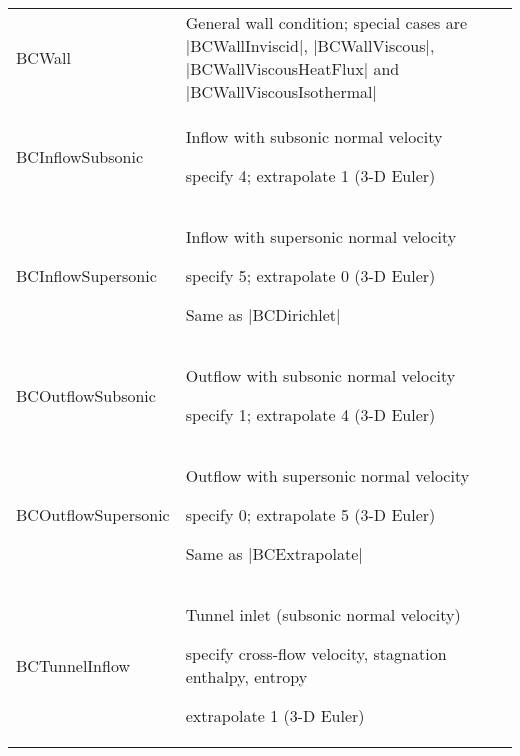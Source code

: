 \begin{longtable}{>{\ttfamily}p{\tmplengtha} >{\raggedright\arraybackslash}p{\Pwidth}}
BCWall                  & General wall condition; special cases are
                          |BCWallInviscid|, |BCWallViscous|,
                          |BCWallViscousHeatFlux| and
                          |BCWallViscousIsothermal| \\[0.5\baselineskip]

BCInflowSubsonic        & Inflow with subsonic normal velocity
                          \begin{mylist}
                          \item specify 4; extrapolate 1 (3-D Euler)
                          \end{mylist}\mbox{}\vspace{-0.5\baselineskip} \\

BCInflowSupersonic      & Inflow with supersonic normal velocity
                          \begin{mylist}
                          \item specify 5; extrapolate 0 (3-D Euler)
                          \end{mylist}
                          Same as |BCDirichlet| \\[0.5\baselineskip]

BCOutflowSubsonic       & Outflow with subsonic normal velocity
                          \begin{mylist}
                          \item specify 1; extrapolate 4 (3-D Euler)
                          \end{mylist}\mbox{}\vspace{-0.5\baselineskip} \\

BCOutflowSupersonic     & Outflow with supersonic normal velocity
                          \begin{mylist}
                          \item specify 0; extrapolate 5 (3-D Euler)
                          \end{mylist}
                          Same as |BCExtrapolate| \\[0.5\baselineskip]

BCTunnelInflow          & Tunnel inlet (subsonic normal velocity)
                          \begin{mylist}
                          \item specify cross-flow velocity, stagnation
                                enthalpy, entropy 
                          \item extrapolate 1 (3-D Euler)
                          \end{mylist}\mbox{}\vspace{-0.5\baselineskip} \\


\end{longtable}
